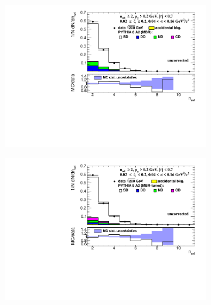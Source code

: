 \begin{figure}[h!]
	\centering
	\begin{subfigure}{.49\textwidth}
		\includegraphics[width=\linewidth, page=1]{chapters/chrgSTAR/img/nonSD/chrg/SDT_pythia_xi0_RP_starsim_nsel.pdf}
	\end{subfigure}
	\begin{subfigure}{.49\textwidth}
		\includegraphics[width=\linewidth, page=1]{chapters/chrgSTAR/img/nonSD/chrg/SDT_pythia_xi0_option2_RP_starsim_nsel.pdf}
	\end{subfigure}
	\begin{subfigure}{.49\textwidth}

\end{subfigure}
\end{figure}
